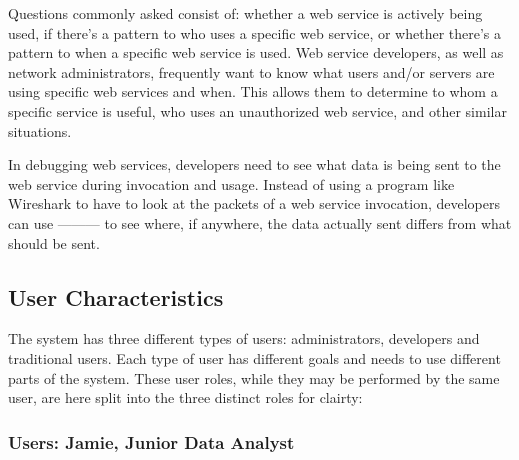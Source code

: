 \documentclass[titlepage]{article}
\begin{document}
Questions commonly asked consist of: whether a web service is actively being used, if
there's a pattern to who uses a specific web service, or whether there's a
pattern to when a specific web service is used.  Web service developers,
as well as network administrators, frequently want to know what users and/or
servers are using specific web services and when.  This allows them to
determine to whom a specific service is useful, who uses an unauthorized web
service, and other similar situations.

In debugging web services, developers need to see what data is being sent to
the web service during invocation and usage.  Instead of using a program like
Wireshark to have to look at the packets of a web service invocation,
developers can use --------- to see where, if anywhere, the data actually
sent differs from what should be sent.


\subsection{User Characteristics%
  \label{user-characteristics}%
}

The system has three different types of users:  administrators, developers and
traditional users.  Each type of user has different goals and needs to use
different parts of the system.  These user roles, while they may be performed
by the same user, are here split into the three distinct roles for clairty:


\subsubsection{Users: Jamie, Junior Data Analyst%
  \label{jamie}%
}
\end{document}
